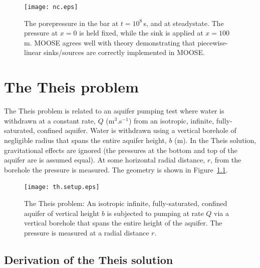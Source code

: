 \documentclass[]{scrreprt}
\begin{document}
\begin{figure}[htb]
\begin{center}
\texttt{[image: nc.eps]}
\caption{The porepressure in the bar at $t=10^{8}$\,s, and at
  steadystate.  The pressure at $x=0$ is held fixed, while the sink is
  applied at $x=100$\,m.  MOOSE agrees well with theory demonstrating
  that piecewise-linear sinks/sources are correctly implemented in MOOSE.}
\label{nc.fig}
\end{center}
\end{figure}


\chapter{The Theis problem}
\label{th}

The Theis problem is related to an aquifer pumping test where water is
withdrawn at a constant rate, $Q$ (m$^{3}$.s$^{-1}$) from an
isotropic, infinite, fully-saturated, confined aquifer.  Water is withdrawn
using a vertical borehole of negligible radius that spans the entire
aquifer height, $b$ (m).  In the Theis solution, gravitational
effects are ignored (the pressures at the bottom and top of the
aquifer are is assumed equal).  At some horizontal radial distance, $r$, from
the borehole the pressure is measured.  The geometry is shown in
Figure~\ref{th.setup.fig}. 

\begin{figure}[htb]
\begin{center}
\texttt{[image: th.setup.eps]}
\caption{The Theis problem: An isotropic infinite, fully-saturated,
  confined aquifer of vertical height $b$ is subjected to pumping at
  rate $Q$ via a vertical borehole that spans the entire height of the
  aquifer.  The pressure is measured at a radial distance $r$.}
\label{th.setup.fig}
\end{center}
\end{figure}

\section{Derivation of the Theis solution}
\end{document}
